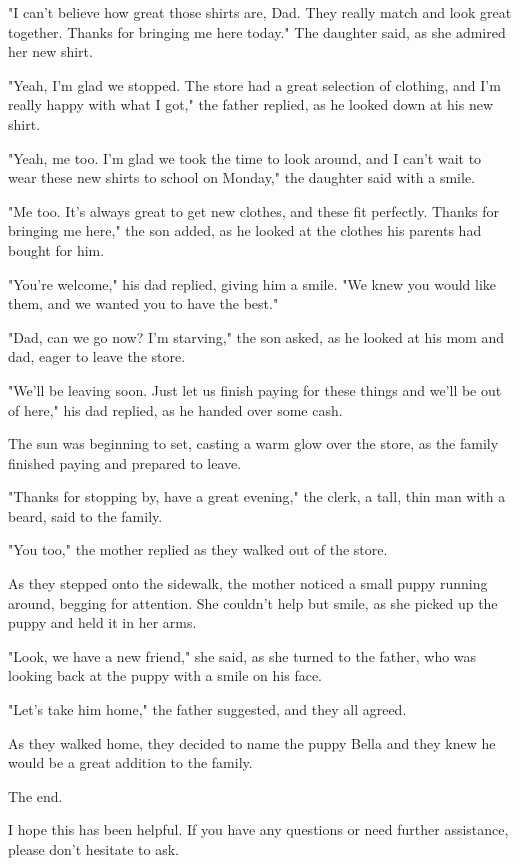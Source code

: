 \documentclass[smalldemyvopaper,11pt,twoside,onecolumn,openright,extrafontsizes]{memoir}
\begin{document}
"I can't believe how great those shirts are, Dad. They really match and look great together. Thanks for bringing me here today." The daughter said, as she admired her new shirt.\par
"Yeah, I'm glad we stopped. The store had a great selection of clothing, and I'm really happy with what I got," the father replied, as he looked down at his new shirt.\par
"Yeah, me too. I'm glad we took the time to look around, and I can't wait to wear these new shirts to school on Monday," the daughter said with a smile.\par
"Me too. It's always great to get new clothes, and these fit perfectly. Thanks for bringing me here," the son added, as he looked at the clothes his parents had bought for him.\par
"You're welcome," his dad replied, giving him a smile. "We knew you would like them, and we wanted you to have the best."\par
"Dad, can we go now? I'm starving," the son asked, as he looked at his mom and dad, eager to leave the store.\par
"We'll be leaving soon. Just let us finish paying for these things and we'll be out of here," his dad replied, as he handed over some cash.\par
The sun was beginning to set, casting a warm glow over the store, as the family finished paying and prepared to leave.\par
"Thanks for stopping by, have a great evening," the clerk, a tall, thin man with a beard, said to the family.\par
"You too," the mother replied as they walked out of the store.\par
As they stepped onto the sidewalk, the mother noticed a small puppy running around, begging for attention. She couldn't help but smile, as she picked up the puppy and held it in her arms.\par
"Look, we have a new friend," she said, as she turned to the father, who was looking back at the puppy with a smile on his face.\par
"Let's take him home," the father suggested, and they all agreed.\par
As they walked home, they decided to name the puppy Bella and they knew he would be a great addition to the family.\par
The end.\par
I hope this has been helpful. If you have any questions or need further assistance, please don't hesitate to ask.\par
\end{document}
